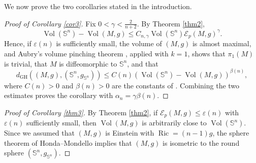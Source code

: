 \documentclass[11pt]{amsart}
\theoremstyle{plain}
\numberwithin{equation}{section}
\renewcommand{\S}{\mathbb{S}}
\newcommand{\ve}{\varepsilon}
\newcommand{\E}{\mathcal{E}}
\DeclareMathOperator{\ric}{Ric}
\DeclareMathOperator{\vol}{Vol}
\begin{document}
We now prove the two corollaries stated in the introduction.

\begin{proof}[Proof of Corollary \ref{cor3}]
Fix $0<\gamma<\frac{2}{n+2}$. By Theorem \ref{thm2}, 
\begin{equation*}
\vol(\S^n)-\vol(M,g)\le C_{n,\gamma}\vol(\S^n)\E_p(M,g)^{\gamma}.
\end{equation*}
Hence, if $\ve(n)$ is sufficiently small, the volume of $(M,g)$ is almost maximal, and Aubry's volume pinching theorem \cite{Aubry2005}, applied with $k=1$, shows that $\pi_1(M)$ is trivial, that $M$ is diffeomorphic to $\S^n$, and that
\begin{equation*}
d_{\mathrm{GH}}((M,g),(\S^n,g_{\S^n}))\le C(n)(\vol(\S^n)-\vol(M,g))^{\beta(n)},
\end{equation*}
where $C(n)>0$ and $\beta(n)>0$ are the constants of \cite{Aubry2005}. Combining the two estimates proves the corollary with $\alpha_n=\gamma\beta(n)$. 
\end{proof}

\begin{proof}[Proof of Corollary \ref{thm3}]
By Theorem \ref{thm2}, if $\E_p(M,g)\le \ve(n)$ with $\ve(n)$ sufficiently small, then $\vol(M,g)$ is arbitrarily close to $\vol(\S^n)$. Since we assumed that $(M,g)$ is Einstein with $\ric=(n-1)g$, the sphere theorem of Honda--Mondello \cite[Theorem C]{HondaMondello} implies that $(M,g)$ is isometric to the round sphere $(\S^n,g_{\S^n})$. 
\end{proof}
\end{document}
